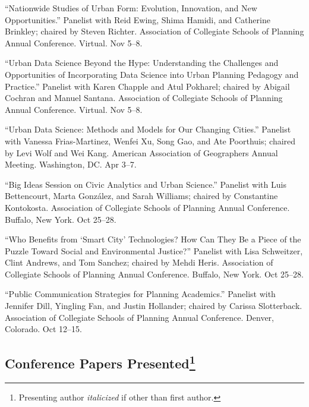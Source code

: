 \documentclass[11pt,letterpaper]{report} %
\begin{document}
\begin{tablist}
\item[2020] \tab{}\enquote{Nationwide Studies of Urban Form: Evolution, Innovation, and New Opportunities.} Panelist with Reid Ewing, Shima Hamidi, and Catherine Brinkley; chaired by Steven Richter. Association of Collegiate Schools of Planning Annual Conference. Virtual. Nov 5--8.

\item[2020] \tab{}\enquote{Urban Data Science Beyond the Hype: Understanding the Challenges and Opportunities of Incorporating Data Science into Urban Planning Pedagogy and Practice.} Panelist with Karen Chapple and Atul Pokharel; chaired by Abigail Cochran and Manuel Santana. Association of Collegiate Schools of Planning Annual Conference. Virtual. Nov 5--8.

\item[2019] \tab{}\enquote{Urban Data Science: Methods and Models for Our Changing Cities.} Panelist with Vanessa Frias-Martinez, Wenfei Xu, Song Gao, and Ate Poorthuis; chaired by Levi Wolf and Wei Kang. American Association of Geographers Annual Meeting. Washington, DC\@. Apr 3--7.

\item[2018] \tab{}\enquote{Big Ideas Session on Civic Analytics and Urban Science.} Panelist with Luis Bettencourt, Marta Gonz{\'a}lez, and Sarah Williams; chaired by Constantine Kontokosta. Association of Collegiate Schools of Planning Annual Conference. Buffalo, New York. Oct 25--28.

\item[2018] \tab{}\enquote{Who Benefits from \enquote{Smart City} Technologies? How Can They Be a Piece of the Puzzle Toward Social and Environmental Justice?} Panelist with Lisa Schweitzer, Clint Andrews, and Tom Sanchez; chaired by Mehdi Heris. Association of Collegiate Schools of Planning Annual Conference. Buffalo, New York. Oct 25--28.

\item[2017] \tab{}\enquote{Public Communication Strategies for Planning Academics.} Panelist with Jennifer Dill, Yingling Fan, and Justin Hollander; chaired by Carissa Slotterback. Association of Collegiate Schools of Planning Annual Conference. Denver, Colorado. Oct 12--15.

\end{tablist}

\subsection*{Conference Papers Presented\footnote{Presenting author \textit{italicized} if other than first author.}}
\end{document}
